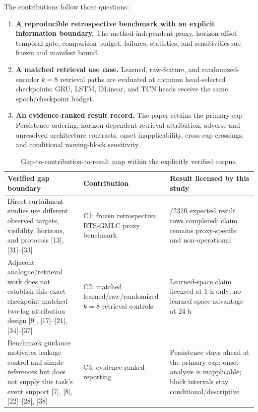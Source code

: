 \documentclass{ieeeaccess}
\providecommand{\tightlist}{\setlength{\itemsep}{0pt}\setlength{\parskip}{0pt}}
\begin{document}
The contributions follow those questions:

\begin{enumerate}
\def\labelenumi{\arabic{enumi}.}
\tightlist
\item
  \textbf{A reproducible retrospective benchmark with an explicit information boundary.} The method-independent proxy, horizon-offset temporal gate, comparison budget, failures, statistics, and sensitivities are frozen and manifest bound.
\item
  \textbf{A matched retrieval use case.} Learned, raw-feature, and randomized-encoder \(k=8\) retrieval paths are evaluated at common head-selected checkpoints; GRU, LSTM, DLinear, and TCN heads receive the same epoch/checkpoint budget.
\item
  \textbf{An evidence-ranked result record.} The paper retains the primary-cap Persistence ordering, horizon-dependent retrieval attribution, adverse and unresolved architecture contrasts, onset inapplicability, cross-cap crossings, and conditional moving-block sensitivity.
\end{enumerate}

\begin{table}[t]
\centering
\footnotesize
\setlength{\tabcolsep}{3pt}
\caption{Gap-to-contribution-to-result map within the explicitly verified corpus.}\label{tab:1}
\begin{tabularx}{\textwidth}{@{}>{\raggedright\arraybackslash}X >{\raggedright\arraybackslash}X >{\raggedright\arraybackslash}X@{}}
\toprule
Verified gap boundary & Contribution & Result licensed by this study \\
\midrule
Direct curtailment studies use different observed targets, visibility, horizons, and protocols [13], [31]--[33] & C1: frozen retrospective RTS-GMLC proxy benchmark & 2310/2310 expected result rows completed; claim remains proxy-specific and non-operational \\
Adjacent analogue/retrieval work does not establish this exact checkpoint-matched two-lag attribution design [9], [17]--[21], [34]--[37] & C2: matched learned/raw/randomized $k=8$ retrieval controls & Learned-space claim licensed at 1 h only; no learned-space advantage at 24 h \\
Benchmark guidance motivates leakage control and simple references but does not supply this task's event support [7], [8], [22]--[28], [38] & C3: evidence-ranked reporting & Persistence stays ahead at the primary cap; onset analysis is inapplicable; block intervals stay conditional/descriptive \\
\bottomrule
\end{tabularx}
\end{table}
\end{document}
